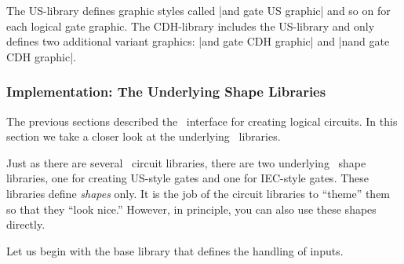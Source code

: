 The US-library defines graphic styles called |and gate US graphic| and
so on for each logical gate graphic. The CDH-library includes the
US-library and only defines two additional variant graphics:
|and gate CDH graphic| and |nand gate CDH graphic|.


\begin{codeexample}[]
\end{codeexample}


\subsubsection{Implementation: The Underlying Shape Libraries}

The previous sections described the \tikzname\ interface for creating
logical circuits. In this section we take a closer look at the
underlying \pgfname\ libraries. 

Just as there are several \tikzname\ circuit libraries, there are two
underlying \pgfname\ shape libraries, one for creating US-style gates
and one for IEC-style gates. These libraries define \emph{shapes}
only. It is the job of the circuit libraries to ``theme'' them so that
they ``look nice.'' However, in principle, you can also use these
shapes directly.

Let us begin with the base library that defines the handling of
inputs.

